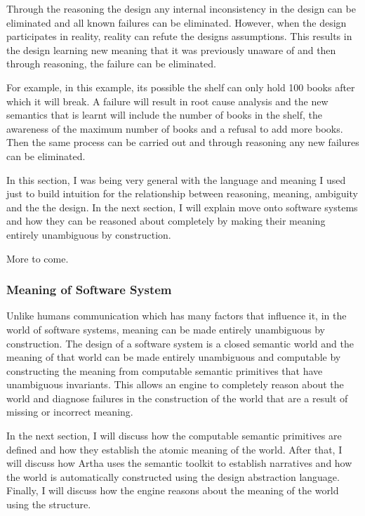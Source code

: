 Through the reasoning the design any internal inconsistency in the design can be eliminated and all known failures can be eliminated. However, when the design participates in reality, reality can refute the designs assumptions. This results in the design learning new meaning that it was previously unaware of and then through reasoning, the failure can be eliminated. 

For example, in this example, its possible the shelf can only hold 100 books after which it will break. A failure will result in root cause analysis and the new semantics that is learnt will include the number of books in the shelf, the awareness of the maximum number of books and a refusal to add more books. Then the same process can be carried out and through reasoning any new failures can be eliminated.

In this section, I was being very general with the language and meaning I used just to build intuition for the relationship between reasoning, meaning, ambiguity and the the design. In the next section, I will explain move onto software systems and how they can be reasoned about completely by making their meaning entirely unambiguous by construction.

More to come.

\subsubsection{Meaning of Software System}

Unlike humans communication which has many factors that influence it, in the world of software systems, meaning can be made entirely unambiguous by construction. The design of a software system is a closed semantic world and the meaning of that world can be made entirely unambiguous and computable by constructing the meaning from computable semantic primitives that have unambiguous invariants. This allows an engine to completely reason about the world and diagnose failures in the construction of the world that are a result of missing or incorrect meaning.

In the next section, I will discuss how the computable semantic primitives are defined and how they establish the atomic meaning of the world. After that, I will discuss how Artha uses the semantic toolkit to establish narratives and how the world is automatically constructed using the design abstraction language. Finally, I will discuss how the engine reasons about the meaning of the world using the structure.

